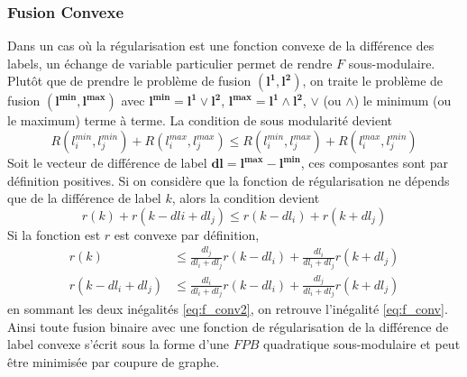 \documentclass[../main/These_Mathias_Paget.tex]{subfiles}
\begin{document}
\subsubsection{Fusion Convexe}
\label{sss:fus_conv}
	Dans un cas où la régularisation est une fonction convexe de la différence des labels, un échange de variable particulier permet de rendre $F$ sous-modulaire. Plutôt que de prendre le problème de fusion $(\boldsymbol{l^1},\boldsymbol{l^2})$, on traite le problème de fusion $(\boldsymbol{l^{min}},\boldsymbol{l^{max}})$ avec $\boldsymbol{l^{min}}= \boldsymbol{l^1} \vee \boldsymbol{l^2}$, $\boldsymbol{l^{max}}= \boldsymbol{l^1} \wedge \boldsymbol{l^2}$, $\vee$ (ou $\wedge$) le minimum (ou le maximum) terme à terme.  La condition de sous modularité devient
	\begin{equation}
	\label{eq:cond_conv}
	R(l^{min}_i,l^{min}_j) + R(l^{max}_i,l^{max}_j) \leq R(l^{min}_i,l^{max}_j) + R(l^{max}_i,l^{min}_j)	
	\end{equation}
	Soit le vecteur de différence de label $\boldsymbol{dl} = \boldsymbol{l^{max}}-\boldsymbol{l^{min}}$, ces composantes sont par définition positives. Si on considère que la fonction de régularisation ne dépends que de la différence de label $k$, alors la condition devient
	\begin{equation}
	\label{eq:f_conv}
	r(k) + r(k-dli+dl_j) \leq r(k-dl_i) + r(k+dl_j)
	\end{equation}
	Si la fonction est $r$ est convexe par définition,
	\begin{equation}
	\label{eq:f_conv2}
		\begin{aligned}
	r(k) & \leq \frac{dl_j}{dl_i+dl_j} r(k-dl_i) + \frac{dl_i}{dl_i+dl_j} r(k+dl_j) \\
	r(k-dl_i+dl_j) & \leq \frac{dl_i}{dl_i+dl_j} r(k-dl_i) + \frac{dl_j}{dl_i+dl_j} r(k+dl_j)
		\end{aligned}
	\end{equation}
	en sommant les deux inégalités \ref{eq:f_conv2}, on retrouve l'inégalité \ref{eq:f_conv}. Ainsi toute fusion binaire avec une fonction de régularisation de la différence de label convexe s'écrit sous la forme d'une $FPB$ quadratique sous-modulaire et peut être minimisée par coupure de graphe.
\end{document}
